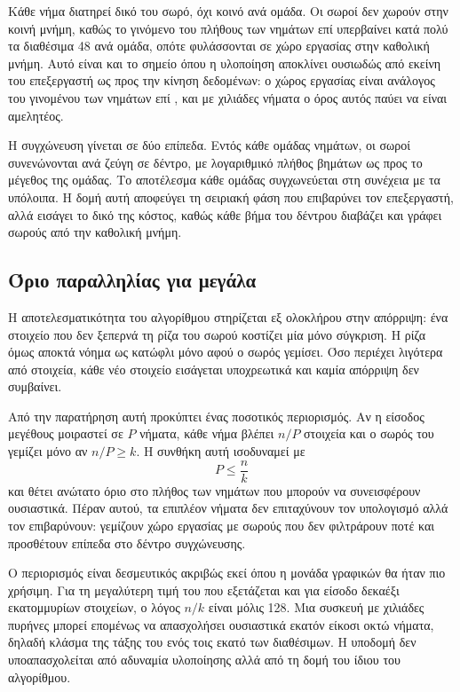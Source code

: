 Κάθε νήμα διατηρεί δικό του σωρό, όχι κοινό ανά ομάδα. Οι σωροί δεν χωρούν στην
κοινή μνήμη, καθώς το γινόμενο του πλήθους των νημάτων επί  υπερβαίνει
κατά πολύ τα διαθέσιμα 48  ανά ομάδα, οπότε φυλάσσονται σε χώρο εργασίας
στην καθολική μνήμη. Αυτό είναι και το σημείο όπου η υλοποίηση αποκλίνει
ουσιωδώς από εκείνη του επεξεργαστή ως προς την κίνηση δεδομένων: ο χώρος
εργασίας είναι ανάλογος του γινομένου των νημάτων επί , και με χιλιάδες
νήματα ο όρος αυτός παύει να είναι αμελητέος.

Η συγχώνευση γίνεται σε δύο επίπεδα. Εντός κάθε ομάδας νημάτων, οι σωροί
συνενώνονται ανά ζεύγη σε δέντρο, με λογαριθμικό πλήθος βημάτων ως προς το
μέγεθος της ομάδας. Το αποτέλεσμα κάθε ομάδας συγχωνεύεται στη συνέχεια με τα
υπόλοιπα. Η δομή αυτή αποφεύγει τη σειριακή φάση που επιβαρύνει τον επεξεργαστή,
αλλά εισάγει το δικό της κόστος, καθώς κάθε βήμα του δέντρου διαβάζει και γράφει
σωρούς από την καθολική μνήμη.

\subsection{Όριο παραλληλίας για μεγάλα }
\label{sec:gpu-mapreduce-limit}

Η αποτελεσματικότητα του αλγορίθμου στηρίζεται εξ ολοκλήρου στην απόρριψη: ένα
στοιχείο που δεν ξεπερνά τη ρίζα του σωρού κοστίζει μία μόνο σύγκριση. Η ρίζα
όμως αποκτά νόημα ως κατώφλι μόνο αφού ο σωρός γεμίσει. Όσο περιέχει λιγότερα
από  στοιχεία, κάθε νέο στοιχείο εισάγεται υποχρεωτικά και καμία απόρριψη
δεν συμβαίνει.

Από την παρατήρηση αυτή προκύπτει ένας ποσοτικός περιορισμός. Αν η είσοδος
μεγέθους  μοιραστεί σε $P$ νήματα, κάθε νήμα βλέπει $n/P$ στοιχεία και ο
σωρός του γεμίζει μόνο αν $n/P \geq k$. Η συνθήκη αυτή ισοδυναμεί με
\[ P \leq \frac{n}{k} \]
και θέτει ανώτατο όριο στο πλήθος των νημάτων που μπορούν να συνεισφέρουν
ουσιαστικά. Πέραν αυτού, τα επιπλέον νήματα δεν επιταχύνουν τον υπολογισμό αλλά
τον επιβαρύνουν: γεμίζουν χώρο εργασίας με σωρούς που δεν φιλτράρουν ποτέ και
προσθέτουν επίπεδα στο δέντρο συγχώνευσης.

Ο περιορισμός είναι δεσμευτικός ακριβώς εκεί όπου η μονάδα γραφικών θα ήταν πιο
χρήσιμη. Για τη μεγαλύτερη τιμή του  που εξετάζεται και για είσοδο
δεκαέξι εκατομμυρίων στοιχείων, ο λόγος $n/k$ είναι μόλις 128. Μια συσκευή με
χιλιάδες πυρήνες μπορεί επομένως να απασχολήσει ουσιαστικά εκατόν είκοσι οκτώ
νήματα, δηλαδή κλάσμα της τάξης του ενός τοις εκατό των διαθέσιμων. Η υποδομή
δεν υποαπασχολείται από αδυναμία υλοποίησης αλλά από τη δομή του ίδιου του
αλγορίθμου.

